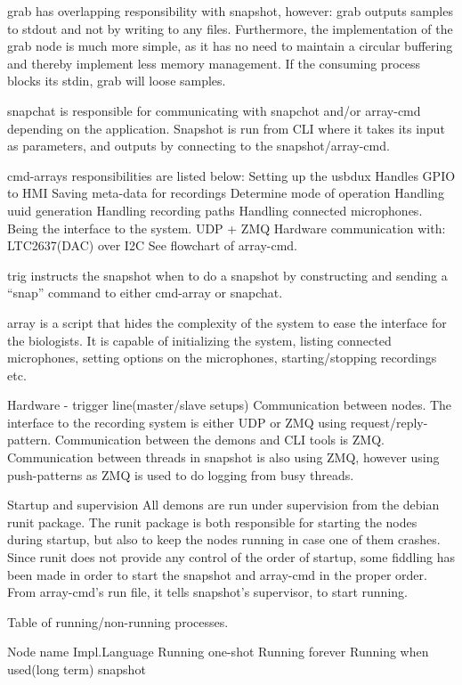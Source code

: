 grab has overlapping responsibility with snapshot, however: grab outputs samples to stdout and not by writing to any files. Furthermore, the implementation of the grab node is much more simple, as it has no need to maintain a circular buffering and thereby implement less memory management. If the consuming process blocks its stdin, grab will loose samples.

snapchat is responsible for communicating with snapchot and/or array-cmd depending on the application. Snapshot is run from CLI where it takes its input as parameters, and outputs by connecting to the snapshot/array-cmd.

cmd-arrays responsibilities are listed below:
Setting up the usbdux 
Handles GPIO to HMI
Saving meta-data for recordings
Determine mode of operation
Handling uuid generation
Handling recording paths
Handling connected microphones.
Being the interface to the system.
UDP + ZMQ
Hardware communication with:
LTC2637(DAC) over I2C
See flowchart of array-cmd.

trig instructs the snapshot when to do a snapshot by constructing and sending a “snap” command to either cmd-array or snapchat.

array is a script that hides the complexity of the system to ease the interface for the biologists. It is capable of initializing the system, listing connected microphones, setting options on the microphones, starting/stopping recordings etc.

Hardware - trigger line(master/slave setups)
Communication between nodes.
The interface to the recording system is either UDP or ZMQ using request/reply-pattern. Communication between the demons and CLI tools is ZMQ. Communication between threads in snapshot is also using ZMQ, however using push-patterns as ZMQ is used to do logging from busy threads.

Startup and supervision
All demons are run under supervision from the debian runit package. The runit package is both responsible for starting the nodes during startup, but also to keep the nodes running in case one of them crashes. Since runit does not provide any control of the order of startup, some fiddling has been made in order to start the snapshot and array-cmd in the proper order. From array-cmd’s run file, it tells snapshot’s supervisor, to start running.

Table of running/non-running processes.


Node name
Impl.Language
Running one-shot
Running forever
Running when used(long term)
snapshot




